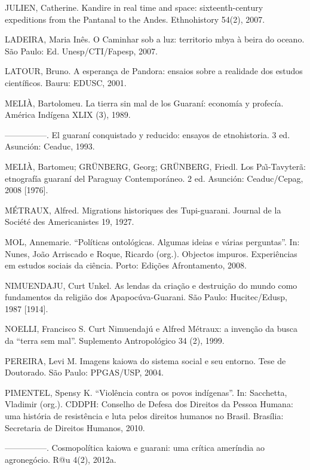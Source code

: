 \documentclass{article}
\begin{document}
JULIEN, Catherine. Kandire in real time and space: sixteenth-century
expeditions from the Pantanal to the Andes. Ethnohistory 54(2), 2007.

LADEIRA, Maria In\^es. O Caminhar sob a luz: territorio mbya \`a beira
do oceano. S\~ao Paulo: Ed. Unesp/CTI/Fapesp, 2007.

LATOUR, Bruno. A esperan\c{c}a de Pandora: ensaios sobre a realidade dos
estudos cient\'ificos. Bauru: EDUSC, 2001.

MELI\`A, Bartolomeu. La tierra sin mal de los Guaran\'i: econom\'ia y
profec\'ia. Am\'erica Ind\'igena XLIX (3), 1989.

{}---{}---{}---{}---{}---. El guaran\'i conquistado y reducido: ensayos
de etnohistoria. 3{\textordfeminine} ed. Asunci\'on: Ceaduc, 1993.

MELI\`A, Bartomeu; GR\"UNBERG, Georg; GR\"UNBERG, Friedl. Los
Pa\~\i{}-Tavyter\~a: etnograf\'ia guaran\'i del Paraguay
Contempor\'aneo. 2{\textordfeminine} ed. Asunci\'on: Ceaduc/Cepag, 2008
[1976].

M\'ETRAUX, Alfred. Migrations historiques des Tupi-guarani. Journal de
la Soci\'et\'e des Americanistes 19, 1927.

MOL, Annemarie. {\textquotedblleft}Pol\'iticas ontol\'ogicas. Algumas
ideias e v\'arias perguntas{\textquotedblright}. In: Nunes, Jo\~ao
Arriscado e Roque, Ricardo (org.). Objectos impuros. Experi\^encias em
estudos sociais da ci\^encia. Porto: Edi\c{c}\~oes Afrontamento, 2008.

NIMUENDAJU, Curt Unkel. As lendas da cria\c{c}\~ao e destrui\c{c}\~ao do
mundo como fundamentos da religi\~ao dos Apapoc\'uva-Guarani. S\~ao
Paulo: Hucitec/Edusp, 1987 [1914].

NOELLI, Francisco S. Curt Nimuendaj\'u e Alfred M\'etraux: a
inven\c{c}\~ao da busca da {\textquotedblleft}terra sem
mal{\textquotedblright}. Suplemento Antropol\'ogico 34 (2), 1999. 

PEREIRA, Levi M. Imagens kaiowa do sistema social e seu entorno. Tese de
Doutorado. S\~ao Paulo: PPGAS/USP, 2004.

PIMENTEL, Spensy K. {\textquotedblleft}Viol\^encia contra os povos
ind\'igenas{\textquotedblright}. In: Sacchetta, Vladimir (org.). CDDPH:
Conselho de Defesa dos Direitos da Pessoa Humana: uma hist\'oria de
resist\^encia e luta pelos direitos humanos no Brasil. Bras\'ilia:
Secretaria de Direitos Humanos, 2010.

{}---{}---{}---{}---{}---. Cosmopol\'itica kaiowa e guarani: uma
cr\'itica amer\'india ao agroneg\'ocio. R@u 4(2), 2012a.
\end{document}
